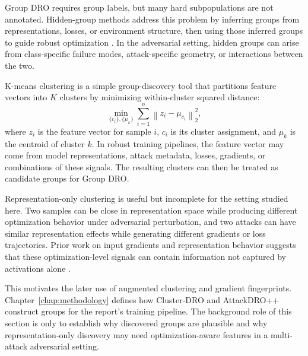 Group DRO requires group labels, but many hard subpopulations are not annotated. Hidden-group methods address this problem by inferring groups from representations, losses, or environment structure, then using those inferred groups to guide robust optimization \cite{sohoni2020no,creager2021environment,liu2021just}. In the adversarial setting, hidden groups can arise from class-specific failure modes, attack-specific geometry, or interactions between the two.

K-means clustering is a simple group-discovery tool that partitions feature vectors into $K$ clusters by minimizing within-cluster squared distance:
\[
\min_{\{c_i\},\{\mu_k\}}
\sum_{i=1}^{n}
\left\|z_i-\mu_{c_i}\right\|_2^2,
\]
where $z_i$ is the feature vector for sample $i$, $c_i$ is its cluster assignment, and $\mu_k$ is the centroid of cluster $k$. In robust training pipelines, the feature vector may come from model representations, attack metadata, losses, gradients, or combinations of these signals. The resulting clusters can then be treated as candidate groups for Group DRO.

Representation-only clustering is useful but incomplete for the setting studied here. Two samples can be close in representation space while producing different optimization behavior under adversarial perturbation, and two attacks can have similar representation effects while generating different gradients or loss trajectories. Prior work on input gradients and representation behavior suggests that these optimization-level signals can contain information not captured by activations alone \cite{charpiat2019input,paul2021deep}.

This motivates the later use of augmented clustering and gradient fingerprints. Chapter~\ref{chap:methodology} defines how Cluster-DRO and AttackDRO++ construct groups for the report's training pipeline. The background role of this section is only to establish why discovered groups are plausible and why representation-only discovery may need optimization-aware features in a multi-attack adversarial setting.
